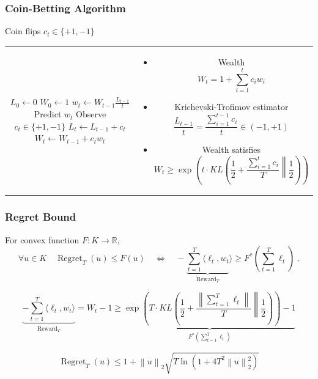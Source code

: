 \documentclass[usenames,dvipsnames]{beamer}
\DeclareMathOperator{\Regret}{Regret}
\DeclareMathOperator{\Reward}{Reward}
\newcommand{\R}{\mathbb{R}}
\newcommand{\norm}[1]{\left\|#1\right\|}
\newcommand{\KL}[2]{KL\left({#1}\middle\|{#2}\right)}
\begin{document}
\begin{frame}
\frametitle{Coin-Betting Algorithm}

\fontsize{10pt}{14}\selectfont

Coin flips $c_t \in \{+1,-1\}$

\vspace{0.5cm}

\begin{tabular}{c|c}
\begin{minipage}{4.3cm}
\begin{algorithmic}
{
\STATE $L_0 \leftarrow 0$
\STATE $W_0 \leftarrow 1$
\FOR{$t=1,2,3,\dots$}
\STATE $w_t \leftarrow W_{t-1} \frac{L_{t-1}}{t} $
\STATE Predict $w_t$
\STATE Observe $c_t \in \{+1,-1\}$
\STATE $L_t \leftarrow L_{t-1} + c_t$
\STATE $W_t \leftarrow W_{t-1} + c_t w_t$
\ENDFOR
}
\end{algorithmic}
\end{minipage}
&
\begin{minipage}{5.7cm}
\pause
\begin{itemize}
\item Wealth
$$
W_t = 1 + \sum_{i=1}^t c_i w_i
$$

\item Krichevski-Trofimov estimator
$$
\frac{L_{t-1}}{t} = \frac{\sum_{i=1}^{t-1} c_i}{t}  \in (-1,+1)
$$

\item Wealth satisfies
$$
W_t \ge \exp \left( t \cdot \KL{\frac{1}{2} + \frac{\sum_{i=1}^t c_i}{T}}{\frac{1}{2}} \right)
$$
\end{itemize}
\end{minipage}
\end{tabular}
\end{frame}

\begin{frame}
\frametitle{Regret Bound}

\begin{theorem}
For convex function $F:K \to \R$,
$$
\forall u \in K \quad \Regret_T(u) \le F(u)
\quad \Longleftrightarrow \quad
- \underbrace{\sum_{t=1}^T \langle \ell_t, w_t}_{\Reward_T} \rangle \ge F^* \left(\sum_{t=1}^T \ell_t \right) \; .
$$
\end{theorem}
\pause
\vspace{-0.5cm}
$$
\underbrace{-\sum_{t=1}^T \langle \ell_t, w_t \rangle}_{\Reward_T}
= W_t - 1
\ge \underbrace{\exp \left( T \cdot \KL{\frac{1}{2} + \frac{\norm{\sum_{t=1}^T \ell_t}}{T}}{\frac{1}{2}} \right) - 1}_{F^*(\sum_{t=1}^T \ell_t)}
$$

\pause

\begin{theorem}
$$
\Regret_T(u) \le 1 + \norm{u}_2 \sqrt{T \ln\left(1 + 4T^2 \norm{u}_2^2 \right)}
$$
\end{theorem}

\end{frame}
\end{document}
